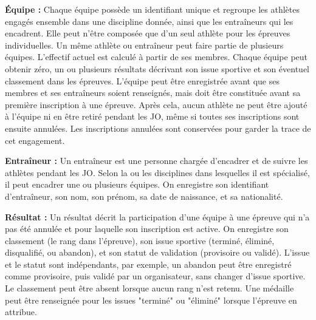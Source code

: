 \begin{concepts}
    \item \textbf{Équipe :} Chaque équipe possède un identifiant unique et regroupe les athlètes engagés ensemble dans une discipline donnée, ainsi que les entraîneurs qui les encadrent. Elle peut n'être composée que d'un seul athlète pour les épreuves individuelles. Un même athlète ou entraîneur peut faire partie de plusieurs équipes. L'effectif actuel est calculé à partir de ses membres. Chaque équipe peut obtenir zéro, un ou plusieurs résultats décrivant son issue sportive et son éventuel classement dans les épreuves. L'équipe peut être enregistrée avant que ses membres et ses entraîneurs soient renseignés, mais doit être constituée avant sa première inscription à une épreuve. Après cela, aucun athlète ne peut être ajouté à l'équipe ni en être retiré pendant les JO, même si toutes ses inscriptions sont ensuite annulées. Les inscriptions annulées sont conservées pour garder la trace de cet engagement.

    \item \textbf{Entraîneur :} Un entraîneur est une personne chargée d'encadrer et de suivre les athlètes pendant les JO. Selon la ou les disciplines dans lesquelles il est spécialisé, il peut encadrer une ou plusieurs équipes. On enregistre son identifiant d'entraîneur, son nom, son prénom, sa date de naissance, et sa nationalité.

    \item \textbf{Résultat :} Un résultat décrit la participation d'une équipe à une épreuve qui n'a pas été annulée et pour laquelle son inscription est active. On enregistre son classement (le rang dans l'épreuve), son issue sportive (terminé, éliminé, disqualifié, ou abandon), et son statut de validation (provisoire ou validé). L'issue et le statut sont indépendants, par exemple, un abandon peut être enregistré comme provisoire, puis validé par un organisateur, sans changer d'issue sportive. Le classement peut être absent lorsque aucun rang n'est retenu. Une médaille peut être renseignée pour les issues "terminé" ou "éliminé" lorsque l'épreuve en attribue.
\end{concepts}
